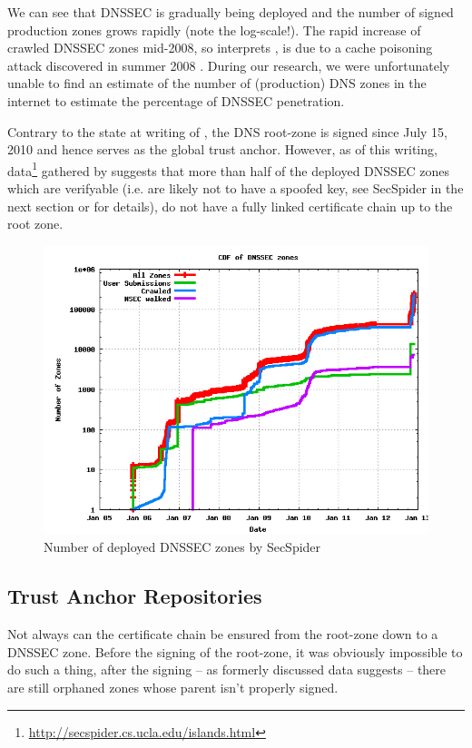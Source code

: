 \documentclass[a4paper,twocolumn]{scrartcl}
\begin{document}
We can see that DNSSEC is gradually being deployed and the number of
signed production zones grows rapidly (note the log-scale!). The rapid
increase of crawled DNSSEC zones mid-2008, so interprets
\cite{Osterweil09}, is due to a cache poisoning attack discovered in
summer 2008 \cite{dnsVuln}. During our research, we were unfortunately
unable to find an estimate of the number of (production) DNS zones in
the internet to estimate the percentage of DNSSEC penetration.

Contrary to the state at writing of \cite{Osterweil09}, the DNS
root-zone is signed since July 15, 2010 \cite{root-dnssec} and hence
serves as the global trust anchor. However, as of this writing,
data\footnote{\url{http://secspider.cs.ucla.edu/islands.html}}
gathered by \cite{secspider} suggests that more than half of the
deployed DNSSEC zones which are verifyable (i.e. are likely not to
have a spoofed key, see SecSpider in the next section or
\cite{Osterweil09} for details), do not have a fully linked
certificate chain up to the root zone.

\begin{figure}
  \includegraphics[width=\linewidth]{dnssec-growth}
  \caption{Number of deployed DNSSEC zones by
    SecSpider \cite{secspider}}
  \label{fig:dnssec-growth}
\end{figure}

\subsection{Trust Anchor Repositories}
Not always can the certificate chain be ensured from the root-zone
down to a DNSSEC zone. Before the signing of the root-zone, it was
obviously impossible to do such a thing, after the signing -- as
formerly discussed data suggests -- there are still orphaned zones
whose parent isn't properly signed.
\end{document}
